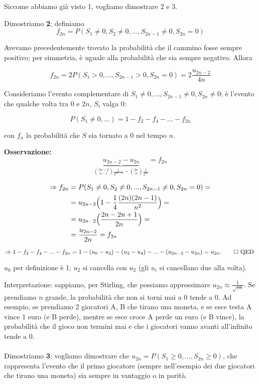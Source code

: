 \documentclass[a4paper,12pt]{book}
\begin{document}
Siccome abbiamo già visto 1, vogliamo dimostrare 2 e 3. 

Dimostriamo \textbf{2}; definiamo 
$$ f_{2n} = P(S_1 \ne 0, S_2 \ne 0, ..., S_{2n-1} \ne 0, S_{2n} = 0) $$

Avevamo precedentemente trovato la probabilità che il cammino fosse sempre positivo; per simmetria, è uguale alla probabilità che sia sempre negativo. Allora

$$ f_{2n} = 2P(S_1 > 0, ..., S_{2n-1} > 0, S_{2n} = 0) = 2\frac{u_{2n-2}}{4n} $$

Consideriamo l'evento complementare di $S_1 \ne 0, ..., S_{2n-1} \ne 0, S_{2n} \ne 0$; è l'evento che qualche volta tra 0 e $ 2n $, $ S_i $ valga 0:

$$ P(S_1 \ne 0, ...) = 1 - f_2 - f_4 - ... - f_{2n} $$

con $ f_n $ la probabilità che $ S $ sia tornato a 0 nel tempo $ n $. 

\textbf{Osservazione:} 
$$ \underbrace{u_{2n-2} - u_{2n}}_{\displaystyle \binom{2n-2}{n-1} \frac{1}{2^{2n-2}} - \binom{2n}{n} \frac{1}{2^{2n}}} = f_{2n} $$

\begin{align*}
	\Rightarrow f_{2n} & = P(S_1 \ne 0, S_2 \ne 0, ..., S_{2n-1} \ne 0, S_{2n} = 0) = \\
	& = u_{2n-2} \Bigl(  1 - \frac{1}{4} \frac{(2n)(2n-1)}{n^2} \Bigr)  = \\
	& = u_{2n-2} \Bigl(\frac{2n - 2n + 1}{2n} \Bigr) = \\
	& = \frac{u_{2n-2}}{2n} = f_{2n} 
\end{align*}

$$ \Rightarrow 1 - f_2 - f_4 - ... - f_{2n} = 1 - (u_0 - u_2) - (u_2 - u_4) - ... - (u_{2n-2} - u_{2n}) = u_{2n}. \qed \text{ QED }$$ 

$ u_0 $ per definizione è 1; $ u_2 $ si cancella con $ u_2 $ (gli $ u_i $ si cancellano due alla volta).

Interpretazione: sappiamo, per Stirling, che possiamo approssimare $ u_{2n} \approx \frac{1}{\sqrt{\pi n}} $. Se prendiamo $ n $ grande, la probabilità che non si torni mai a 0 tende a 0. Ad esempio, se prendiamo 2 giocatori A, B che tirano una moneta, e se esce testa A vince 1 euro (e B perde), mentre se esce croce A perde un euro (e B vince), la probabilità che il gioco non termini mai e che i giocatori vanno avanti all'infinito tende a 0. 
\\
\\
Dimostriamo \textbf{3}; vogliamo dimostrare che $ u_{2n} = P(S_1 \ge 0, ..., S_{2n} \ge 0 ) $, che rappresenta l'evento che il primo giocatore (sempre nell'esempio dei due giocatori che tirano una moneta) sia sempre in vantaggio o in parità. 
\end{document}
